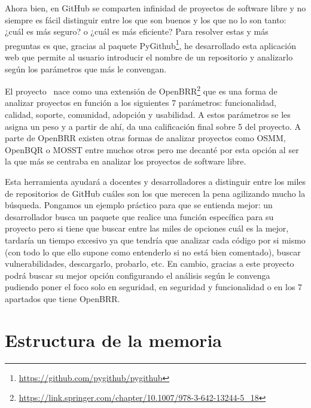 \documentclass[a4paper, 12pt]{book}
\begin{document}
Ahora bien, en GitHub se comparten infinidad de proyectos de software libre y no siempre es fácil distinguir entre los que son buenos y los que no lo son tanto: ¿cuál es más seguro? o ¿cuál es más eficiente?
Para resolver estas y más preguntas es que, gracias al paquete PyGithub\footnote{\url{https://github.com/pygithub/pygithub}}, he desarrollado esta aplicación web que permite al usuario introducir el nombre de un repositorio y analizarlo según los parámetros que más
le convengan.

El proyecto~\cite{website:RepositorioTFG}  nace como una extensión de OpenBRR\footnote{\url{https://link.springer.com/chapter/10.1007/978-3-642-13244-5_18}} que es una forma de analizar proyectos en función a los siguientes 7 parámetros: funcionalidad, calidad, soporte, comunidad, adopción y usabilidad.
A estos parámetros se les asigna un peso y a partir de ahí, da una calificación final sobre 5 del proyecto. A parte de OpenBRR existen otras formas de analizar proyectos como OSMM, OpenBQR o MOSST entre muchos otros pero me decanté por esta opción al ser la que más se 
centraba en analizar los proyectos de software libre.

Esta herramienta ayudará a docentes y desarrolladores a distinguir entre los miles de repositorios de GitHub cuáles son los que merecen la pena agilizando mucho la búsqueda. Pongamos un ejemplo práctico para que se entienda mejor: un desarrollador busca un paquete
que realice una función específica para su proyecto pero si tiene que buscar entre las miles de opciones cuál es la mejor, tardaría un tiempo excesivo ya que tendría que analizar cada código por si mismo (con todo lo que ello supone como entenderlo si no está bien comentado),
buscar vulnerabilidades, descargarlo, probarlo, etc. En cambio, gracias a este proyecto podrá buscar su mejor opción configurando el análisis según le convenga pudiendo poner el foco solo en seguridad, en seguridad y funcionalidad o en los 7 apartados que tiene OpenBRR.


\section{Estructura de la memoria}
\label{sec:estructura}
\end{document}
